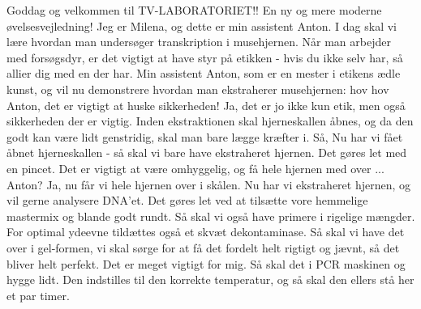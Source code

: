 \documentclass[a4paper,11pt]{article}
\begin{document}
\begin{sketch}

\begin{center}

\end{center}

Goddag og velkommen til TV-LABORATORIET!! En ny og mere moderne øvelsesvejledning! Jeg er Milena, og dette er min assistent Anton. I dag skal vi lære hvordan man undersøger transkription i musehjernen. Når man arbejder med forsøgsdyr, er det vigtigt at have styr på etikken - hvis du ikke selv har, så allier dig med en der har. Min assistent Anton, som er en mester i etikens ædle kunst, og vil nu demonstrere hvordan man ekstraherer musehjernen:
 hov hov Anton, det er vigtigt at huske sikkerheden! Ja, det er jo ikke kun etik, men også sikkerheden der er vigtig. Inden ekstraktionen skal hjerneskallen åbnes, og da den godt kan være lidt genstridig, skal man bare lægge kræfter i. 
 Så, Nu har vi fået åbnet hjerneskallen - så skal vi bare have ekstraheret hjernen. Det gøres let med en pincet. Det er  vigtigt at være omhyggelig, og få hele hjernen med over ... Anton?
 Ja, nu får vi hele hjernen over i skålen.
 Nu har vi ekstraheret hjernen, og vil gerne analysere DNA'et. Det gøres let ved at tilsætte vore hemmelige mastermix og blande godt rundt. Så skal vi også have primere i rigelige mængder. For optimal ydeevne tildættes også et skvæt dekontaminase. 
 Så skal vi have det over i gel-formen, vi skal sørge for at få det fordelt helt rigtigt og jævnt, så det bliver helt perfekt. Det er meget vigtigt for mig. Så skal det i PCR maskinen og hygge lidt. Den indstilles til den korrekte temperatur, og så skal den ellers stå her et par timer. 

\end{sketch}
\end{document}
